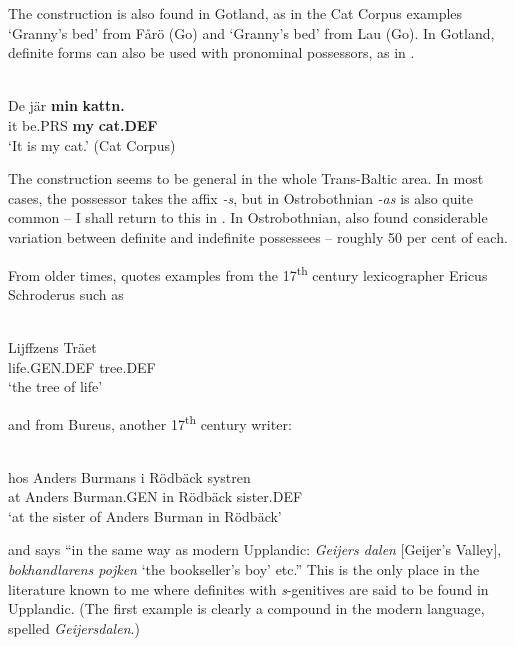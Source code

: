 The construction is also found in Gotland, as in the Cat Corpus examples  ‘Granny’s bed’ from Fårö (Go) and ‘Granny’s bed’ from Lau (Go). In Gotland, definite forms can also be used with pronominal possessors, as in .

\ea\label{}
\\
\gll De  jär  \textbf{min} \textbf{kattn.}\\
it  be.PRS  \textbf{my} \textbf{cat.DEF}\\
\glt  ‘It is my cat.’ (Cat Corpus)
\z

The construction seems to be general in the whole Trans-Baltic area. In most cases, the possessor takes the affix\textit{ {}-s}, but in Ostrobothnian\textit{ {}-as }is also quite common – I shall return to this in . In Ostrobothnian, \citet{ErikssonEtAl} also found considerable variation between definite and indefinite possessees – roughly 50 per cent of each. 

From older times, \citet[523]{Hesselman1908} quotes examples from the 17\textsuperscript{th} century lexicographer Ericus Schroderus such as

\ea\label{}
\\
\gll Lijffzens  Träet\\
life.GEN.DEF  tree.DEF\\
\glt  ‘the tree of life’
\z

and from Bureus, another 17\textsuperscript{th} century writer:


\ea\label{}
\\
\gll hos  Anders  Burmans  i  Rödbäck  systren\\
at  Anders  Burman.GEN  in  Rödbäck  sister.DEF\\
\glt ‘at the sister of Anders Burman in Rödbäck’
\z

and says “in the same way as modern Upplandic: \textit{Geijers dalen }[Geijer’s Valley], \textit{bokhandlarens pojken} ‘the bookseller’s boy’ etc.” This is the only place in the literature known to me where definites with \textit{s}{}-genitives are said to be found in Upplandic. (The first example is clearly a compound in the modern language, spelled \textit{Geijersdalen}.)

